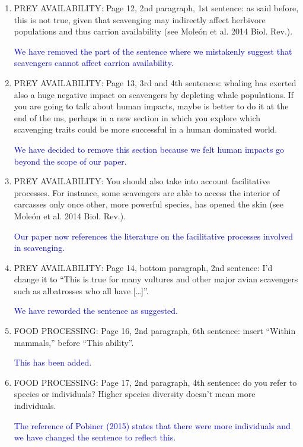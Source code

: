 \documentclass[12pt,letterpaper]{article}
\begin{document}
{\begin{enumerate}
\item{PREY AVAILABILITY:} Page 12, 2nd paragraph, 1st sentence: as said before, this is not true, given that scavenging may indirectly affect herbivore populations and thus carrion availability (see Mole\'{o}n et al. 2014 Biol. Rev.).

\textcolor{blue}{We have removed the part of the sentence where we mistakenly suggest that scavengers cannot affect carrion availability.}

\item{PREY AVAILABILITY:} Page 13, 3rd and 4th sentences: whaling has exerted also a huge negative impact on scavengers by depleting whale populations. If you are going to talk about human impacts, maybe is better to do it at the end of the ms, perhaps in a new section in which you explore which scavenging traits could be more successful in a human dominated world.

\textcolor{blue}{We have decided to remove this section because we felt human impacts go beyond the scope of our paper.}

\item{PREY AVAILABILITY:} You should also take into account facilitative processes. For instance, some scavengers are able to access the interior of carcasses only once other, more powerful species, has opened the skin (see Mole\'{o}n et al. 2014 Biol. Rev.).

\textcolor{blue}{Our paper now references the literature on the facilitative processes involved in scavenging.}

\item{PREY AVAILABILITY:} Page 14, bottom paragraph, 2nd sentence: I'd change it to ``This is true for many vultures and other major avian scavengers such as albatrosses who all have […]''.

\textcolor{blue}{We have reworded the sentence as suggested.}

\item{FOOD PROCESSING:} Page 16, 2nd paragraph, 6th sentence: insert ``Within mammals,'' before ``This ability''.

\textcolor{blue}{This has been added.}

\item{FOOD PROCESSING:} Page 17, 2nd paragraph, 4th sentence: do you refer to species or individuals? Higher species diversity doesn't mean more individuals.

\textcolor{blue}{The reference of Pobiner (2015) states that there were more individuals and we have changed the sentence to reflect this.}


\end{enumerate}}
\end{document}
